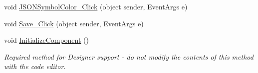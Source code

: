 \begin{DoxyCompactItemize}
\item 
void \mbox{\hyperlink{class_cert_complete_1_1_preferences_aaf6ff013f4f7e3948c30dc32cf50383a}{J\+S\+O\+N\+Symbol\+Color\+\_\+\+Click}} (object sender, Event\+Args e)
\item 
void \mbox{\hyperlink{class_cert_complete_1_1_preferences_a97d5821ba2fc9ac53d5aefea09da6136}{Save\+\_\+\+Click}} (object sender, Event\+Args e)
\item 
void \mbox{\hyperlink{class_cert_complete_1_1_preferences_a7fef9667c42378361d486d06d0ea3407}{Initialize\+Component}} ()
\begin{DoxyCompactList}\small\item\em Required method for Designer support -\/ do not modify the contents of this method with the code editor. \end{DoxyCompactList}\end{DoxyCompactItemize}
